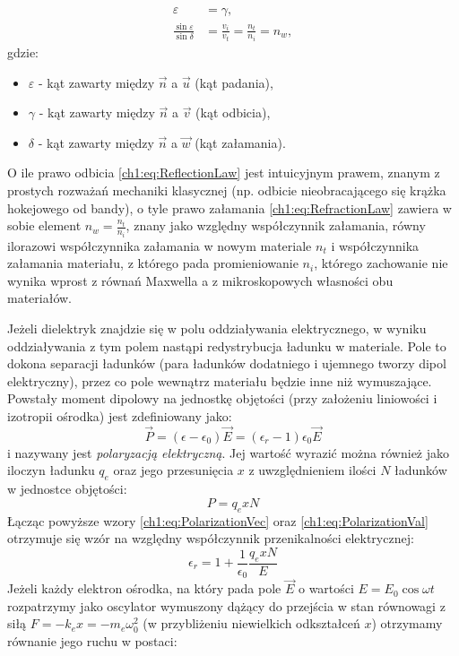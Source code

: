 \begin{align}
\label{ch1:eq:ReflectionLaw}
\varepsilon &= \gamma,\\
\label{ch1:eq:RefractionLaw}
\frac{\sin\varepsilon}{\sin\delta} &= \frac{v_i}{v_t} = \frac{n_t}{n_i} = n_w,
\end{align}
gdzie:
\begin{itemize}
\item[] $\varepsilon$ - kąt zawarty między $\vec{n}$ a $\vec{u}$ (kąt padania),
\item[] $\gamma$ - kąt zawarty między $\vec{n}$ a $\vec{v}$ (kąt odbicia),
\item[] $\delta$ - kąt zawarty między $\vec{n}$ a $\vec{w}$ (kąt załamania).
\end{itemize}
O ile prawo odbicia \eqref{ch1:eq:ReflectionLaw} jest intuicyjnym prawem, znanym z prostych rozważań mechaniki klasycznej (np. odbicie nieobracającego się krążka hokejowego od bandy), o tyle prawo załamania \eqref{ch1:eq:RefractionLaw} zawiera w sobie element $n_w = \frac{n_t}{n_i}$, znany jako względny współczynnik załamania, równy ilorazowi współczynnika załamania w nowym materiale $n_t$ i współczynnika załamania materiału, z którego pada promieniowanie $n_i$, którego zachowanie nie wynika wprost z równań Maxwella a z mikroskopowych własności obu materiałów. 

Jeżeli dielektryk znajdzie się w polu oddziaływania elektrycznego, w wyniku oddziaływania z tym polem nastąpi redystrybucja ładunku w materiale. Pole to dokona separacji ładunków (para ładunków dodatniego i ujemnego tworzy dipol elektryczny), przez co pole wewnątrz materiału będzie inne niż wymuszające. Powstały moment dipolowy na jednostkę objętości (przy założeniu liniowości i izotropii ośrodka) jest zdefiniowany jako:
\begin{equation}
\vec{P} = (\epsilon - \epsilon_0)\vec{E} = (\epsilon_r - 1)\epsilon_0\vec{E}
\label{ch1:eq:PolarizationVec}
\end{equation}
i nazywany jest \textit{polaryzacją elektryczną}. Jej wartość wyrazić można również jako iloczyn ładunku $q_e$ oraz jego przesunięcia $x$ z uwzględnieniem ilości $N$ ładunków w jednostce objętości:
\begin{equation}
P = q_exN
\label{ch1:eq:PolarizationVal}
\end{equation}
Łącząc powyższe wzory \eqref{ch1:eq:PolarizationVec} oraz \eqref{ch1:eq:PolarizationVal} otrzymuje się wzór na względny współczynnik przenikalności elektrycznej:
\begin{equation}
\epsilon_r = 1 + \frac{1}{\epsilon_0}\frac{q_exN}{E}
\label{ch1:eq:RelativeEpsilon}
\end{equation}
Jeżeli każdy elektron ośrodka, na który pada pole $\vec{E}$ o wartości $E = E_0\cos\omega t$ rozpatrzymy jako oscylator wymuszony dążący do przejścia w stan równowagi z siłą $F = -k_ex = -m_e\omega_0^2$ (w przybliżeniu niewielkich odkształceń $x$) otrzymamy równanie jego ruchu w postaci:

